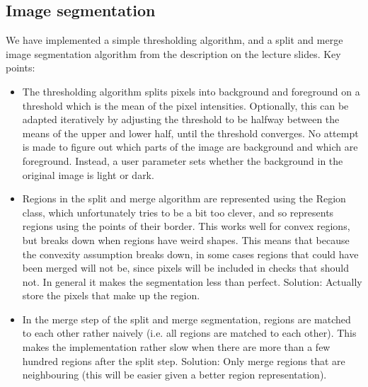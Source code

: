 \subsection{Image segmentation}
We have implemented a simple thresholding algorithm, and a split and
merge image segmentation algorithm from the description on the lecture
slides. Key points:

\begin{itemize}

\item The thresholding algorithm splits pixels into background and
  foreground on a threshold which is the mean of the pixel
  intensities. Optionally, this can be adapted iteratively by
  adjusting the threshold to be halfway between the means of the upper
  and lower half, until the threshold converges. No attempt is made to
  figure out which parts of the image are background and which are
  foreground. Instead, a user parameter sets whether the background in
  the original image is light or dark.
\item Regions in the split and merge algorithm are represented using
  the Region class, which unfortunately tries to be a bit too clever,
  and so represents regions using the points of their border. This
  works well for convex regions, but breaks down when regions have
  weird shapes. This means that because the convexity assumption
  breaks down, in some cases regions that could have been merged will
  not be, since pixels will be included in checks that should not. In
  general it makes the segmentation less than perfect. Solution:
  Actually store the pixels that make up the region.
\item In the merge step of the split and merge segmentation, regions
  are matched to each other rather naively (i.e. all regions are
  matched to each other). This makes the implementation rather slow
  when there are more than a few hundred regions after the split step.
  Solution: Only merge regions that are neighbouring (this will be
  easier given a better region representation).
\end{itemize}
